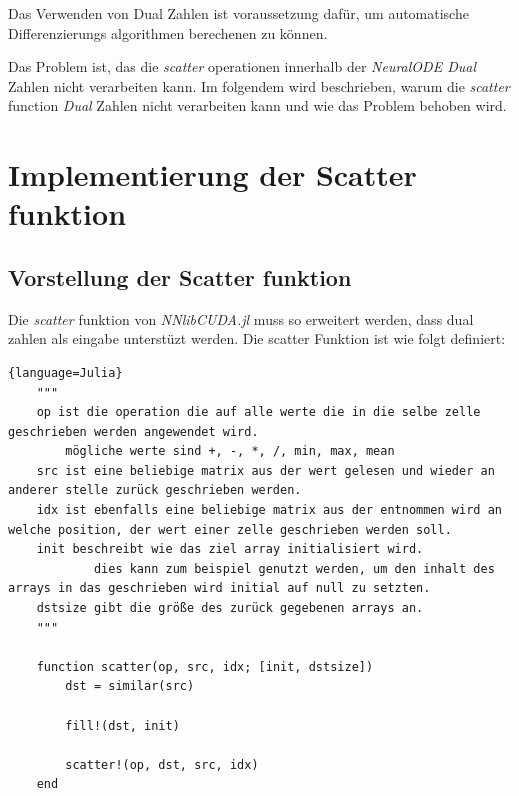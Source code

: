 Das Verwenden von Dual Zahlen ist voraussetzung dafür, um automatische Differenzierungs algorithmen berechenen zu können.

Das Problem ist, das die \textit{scatter} operationen innerhalb der \textit{NeuralODE Dual} Zahlen nicht verarbeiten kann.
Im folgendem wird beschrieben, warum die \textit{scatter} function \textit{Dual} Zahlen nicht verarbeiten kann und wie das Problem behoben wird.



\section{Implementierung der Scatter funktion}

\subsection{Vorstellung der Scatter funktion}


Die \textit{scatter} funktion von \textit{NNlibCUDA.jl} muss so erweitert werden, dass dual zahlen als eingabe unterstüzt werden.
Die scatter Funktion ist wie folgt definiert:


\begin{lstlisting}{language=Julia}
	"""
	op ist die operation die auf alle werte die in die selbe zelle geschrieben werden angewendet wird.
		mögliche werte sind +, -, *, /, min, max, mean
	src ist eine beliebige matrix aus der wert gelesen und wieder an anderer stelle zurück geschrieben werden.
	idx ist ebenfalls eine beliebige matrix aus der entnommen wird an welche position, der wert einer zelle geschrieben werden soll.
	init beschreibt wie das ziel array initialisiert wird.
			dies kann zum beispiel genutzt werden, um den inhalt des arrays in das geschrieben wird initial auf null zu setzten.
	dstsize gibt die größe des zurück gegebenen arrays an.
	"""

	function scatter(op, src, idx; [init, dstsize])
		dst = similar(src)
		
		fill!(dst, init)
		
		scatter!(op, dst, src, idx)
	end
\end{lstlisting}


